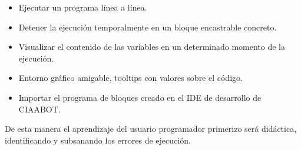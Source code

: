 \begin{itemize}
	\item Ejecutar un programa línea a línea.
	\item Detener la ejecución temporalmente en un bloque encastrable concreto.
	\item Visualizar el contenido de las variables en un determinado momento de la
	ejecución.
	\item Entorno gráfico amigable, tooltips con valores sobre el código.
	\item Importar el programa de bloques creado en el IDE de desarrollo de CIAABOT.	
\end{itemize}

De esta manera el aprendizaje del usuario programador primerizo será didáctica,
identificando y subsanando los errores de ejecución.







